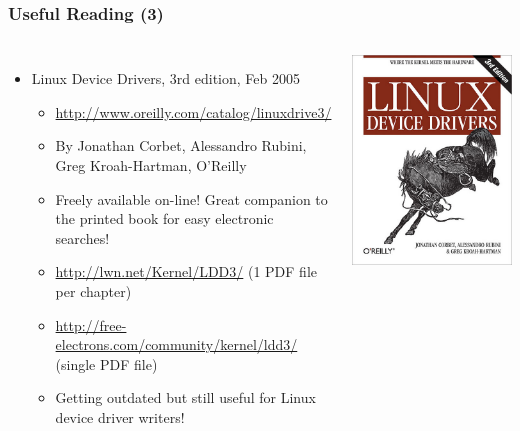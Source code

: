 \begin{frame}
  \frametitle{Useful Reading (3)}
  \begin{columns}
    \begin{itemize}
    \item Linux Device Drivers, 3rd edition, Feb 2005
      \begin{itemize}
      \item \url{http://www.oreilly.com/catalog/linuxdrive3/}
      \item By Jonathan Corbet, Alessandro Rubini, Greg Kroah-Hartman,
        O'Reilly
      \item Freely available on-line! Great companion to the printed
        book for easy electronic searches!
      \item \url{http://lwn.net/Kernel/LDD3/} (1 PDF file per chapter)
      \item \url{http://free-electrons.com/community/kernel/ldd3/}
        (single PDF file)
      \item Getting outdated but still useful for Linux device driver
        writers!
      \end{itemize}
    \end{itemize}
    \includegraphics[width=\textwidth]{slides/kernel-resources-references/linux-device-drivers.jpg}
  \end{columns}
\end{frame}

